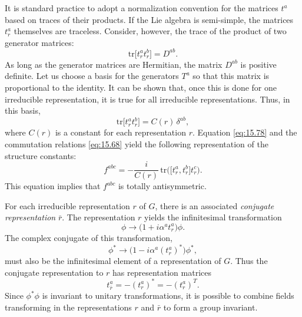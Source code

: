It is standard practice to adopt a normalization convention for the matrices
$t^a$ based on traces of their products.  If the Lie algebra is semi-simple,
the matrices $t^a_r$ themselves are traceless.  Consider, however, the trace
of the product of two generator matrices:
\begin{equation}
  \mathrm{tr}\bigl[ t^a_r t^b_r \bigr] = D^{ab} .
  \label{eq:15.77}
\end{equation}
As long as the generator matrices are Hermitian, the matrix $D^{ab}$ is
positive definite.  Let us choose a basis for the generators $T^a$ so that
this matrix is proportional to the identity.  It can be shown that, once this
is done for one irreducible representation, it is true for all irreducible
representations.  Thus, in this basis,
\begin{equation}
  \mathrm{tr}\bigl[ t^a_r t^b_r \bigr] = C(r)\,\delta^{ab} ,
  \label{eq:15.78}
\end{equation}
where $C(r)$ is a constant for each representation $r$.  Equation
\eqref{eq:15.78} and the commutation relations \eqref{eq:15.68} yield the
following representation of the structure constants:
\begin{equation}
  f^{abc} = -\frac{i}{C(r)}\,\mathrm{tr}\bigl( \bigl[ t^a_r, t^b_r \bigr]
    t^c_r \bigr) .
  \label{eq:15.79}
\end{equation}
This equation implies that $f^{abc}$ is totally antisymmetric.

For each irreducible representation $r$ of $G$, there is an associated
\emph{conjugate representation} $\bar{r}$.  The representation $r$ yields the
infinitesimal transformation
\begin{equation}
  \phi \to \bigl( 1 + i\alpha^a t^a_r \bigr)\phi .
  \label{eq:15.80}
\end{equation}
The complex conjugate of this transformation,
\begin{equation}
  \phi^{*} \to \bigl( 1 - i\alpha^a (t^a_r)^{*} \bigr)\phi^{*} ,
  \label{eq:15.81}
\end{equation}
must also be the infinitesimal element of a representation of $G$.  Thus the
conjugate representation to $r$ has representation matrices
\begin{equation}
  t^a_{\bar{r}} = -(t^a_r)^{*} = -(t^a_r)^T .
  \label{eq:15.82}
\end{equation}
Since $\phi^{*}\phi$ is invariant to unitary transformations, it is possible
to combine fields transforming in the representations $r$ and $\bar{r}$ to
form a group invariant.

